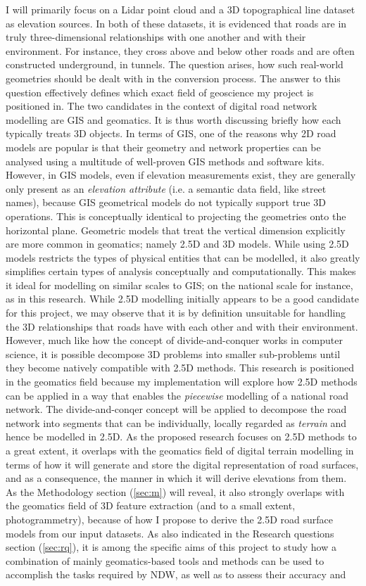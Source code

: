 I will primarily focus on a Lidar point cloud and a 3D topographical line dataset as elevation sources. In both of these datasets, it is evidenced that roads are in truly three-dimensional relationships with one another and with their environment. For instance, they cross above and below other roads and are often constructed underground, in tunnels. The question arises, how such real-world geometries should be dealt with in the conversion process. The answer to this question effectively defines which exact field of geoscience my project is positioned in. The two candidates in the context of digital road network modelling are GIS and geomatics. It is thus worth discussing briefly how each typically treats 3D objects. In terms of GIS, one of the reasons why 2D road models are popular is that their geometry and network properties can be analysed using a multitude of well-proven GIS methods and software kits. However, in GIS models, even if elevation measurements exist, they are generally only present as an \textit{elevation attribute} (i.e. a semantic data field, like street names), because GIS geometrical models do not typically support true 3D operations. This is conceptually identical to projecting the geometries onto the horizontal plane. Geometric models that treat the vertical dimension explicitly are more common in geomatics; namely 2.5D and 3D models. While using 2.5D models restricts the types of physical entities that can be modelled, it also greatly simplifies certain types of analysis conceptually and computationally. This makes it ideal for modelling on similar scales to GIS; on the national scale for instance, as in this research. While 2.5D modelling initially appears to be a good candidate for this project, we may observe that it is by definition unsuitable for handling the 3D relationships that roads have with each other and with their environment. However, much like how the concept of divide-and-conquer works in computer science, it is possible decompose 3D problems into smaller sub-problems until they become natively compatible with 2.5D methods. This research is positioned in the geomatics field because my implementation will explore how 2.5D methods can be applied in a way that enables the \textit{piecewise} modelling of a national road network. The divide-and-conqer concept will be applied to decompose the road network into segments that can be individually, locally regarded as \textit{terrain} and hence be modelled in 2.5D. As the proposed research focuses on 2.5D methods to a great extent, it overlaps with the geomatics field of digital terrain modelling in terms of how it will generate and store the digital representation of road surfaces, and as a consequence, the manner in which it will derive elevations from them. As the Methodology section (\ref{sec:m}) will reveal, it also strongly overlaps with the geomatics field of 3D feature extraction (and to a small extent, photogrammetry), because of how I propose to derive the 2.5D road surface models from our input datasets. As also indicated in the Research questions section (\ref{sec:rq}), it is among the specific aims of this project to study how a combination of mainly geomatics-based tools and methods can be used to accomplish the tasks required by NDW, as well as to assess their accuracy and 